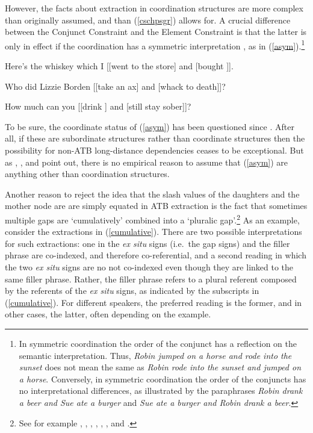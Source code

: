 \documentclass[output=paper]{langsci/langscibook}
\begin{document}
  However,  the facts about extraction in coordination structures are more complex than originally assumed, and than (\ref{cschpsgr}) allows for. A crucial  difference between the Conjunct Constraint and the Element Constraint is  that the latter is only in effect if the coordination has a symmetric interpretation  \citep{Ross67,goldsmith,lakoff86,levinprince86}, as in  (\ref{asym}).\footnote{In symmetric coordination the order of the conjunct has a reflection on the semantic interpretation.
  Thus, \emph{Robin jumped on a horse and rode into the sunset} does not 
mean the same as  \emph{Robin rode into the sunset and jumped on a horse}. Conversely,
in symmetric coordination the order of the conjuncts has no interpretational  differences,
as illustrated by the paraphrases \emph{Robin drank a beer and Sue ate a burger}
and \emph{Sue ate a burger and Robin drank a beer}.}


\ea  
\ea
 Here's the whiskey  which I [[went to the store] and [bought \spc]].
\item Who did Lizzie Borden [[take an ax] and [whack \spcs to death]]?
\item How much can you [[drink \spc] and [still stay sober]]?
\z \label{asym}
\z


\noindent
To be sure, the coordinate status of (\ref{asym}) has been questioned since \cite{Ross67}. After all, if these are subordinate structures rather than coordinate structures then the possibility for non-ATB long-distance dependencies ceases to be exceptional. But as 
\citet{schmerling72},  \citet{lakoff86}, \citet{levinepostal} and \citet[cf.]{kehler}  point out,  there is no empirical reason to assume that (\ref{asym}) are anything other than coordination structures. 

Another reason to reject the idea that  the {\sc slash} values of the daughters and the mother node are are simply equated in ATB extraction is the fact that sometimes multiple gaps are `cumulatively' combined into a `pluralic gap'.\footnote{See for example  \citet{munn98atb,munn99atb},  \citet[136,160]{postal98},
    \citet[125]{kehler},
 \citet{gawronkehlersalt}, 
 \citet{zhang}, \citet{chavessubjexp}, and \citet{Vicente2016-NELS46}.}
As an example, consider the extractions in (\ref{cumulative}). There are two possible interpretations
for such extractions: one in the \emph{ex situ} signs (i.e.\ the gap signs) and the filler phrase are co-indexed, and therefore co-referential, and a second reading in which the two \emph{ex situ} signs are no not co-indexed even though they are linked to the same filler phrase.  Rather, the filler phrase refers to a plural
 referent composed by the referents of the \emph{ex situ} signs, as indicated by the subscripts 
in (\ref{cumulative}). For different speakers, the preferred reading is the former, and in other cases,
the latter, often depending on the example.
\end{document}
